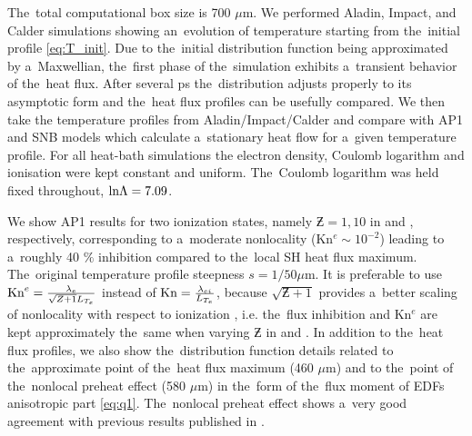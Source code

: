 The~total computational box size is 700 $\mu$m.
We performed Aladin, Impact, and Calder simulations showing an~evolution of
temperature starting from the~initial profile \eqref{eq:T_init}. 
Due to the~initial distribution function being approximated by a~Maxwellian,
the~first phase of the~simulation exhibits a~transient behavior of the~heat
flux. After several ps the~distribution adjusts properly to its asymptotic form
and the~heat flux profiles can be usefully compared. 
We then take the temperature profiles from Aladin/Impact/Calder and compare 
with AP1 and SNB models which calculate a~stationary heat flow
for a~given temperature profile. 
For all heat-bath simulations the electron density, Coulomb logarithm and 
ionisation were kept constant and uniform.
The~Coulomb logarithm was held fixed throughout, $\text{ln}\Lambda = 7.09$.

We show AP1 results for two ionization states, namely $\Zbar= 1, 10$ 
in  and , 
respectively, corresponding to a~moderate nonlocality 
(Kn$^e \sim 10^{-2}$) leading to a~roughly 40 $\%$ inhibition compared 
to the~local SH heat flux maximum. The~original temperature profile steepness
$s = 1/50 \mu$m.
It is preferable to use 
$\text{Kn}^e = \frac{\lambda_e}{\sqrt{Z + 1}L_{T_e}}$ instead of
 $\text{Kn} = \frac{\lambda_{ei}}{L_{T_e}}$, because $\sqrt{\Zbar + 1}$ provides 
a~better scaling of nonlocality with respect
to ionization \cite{LMV_1983_7}, i.e. the~flux inhibition and Kn$^e$ are
kept approximately the~same when varying $\Zbar$ in 
 and .
In addition to the~heat flux profiles, we also show the~distribution function 
details related to the~approximate point of the~heat flux maximum (460 $\mu$m) 
and to the~point of the~nonlocal preheat effect (580 $\mu$m) in the~form of
the~flux moment of EDFs anisotropic part \eqref{eq:q1}.
The~nonlocal preheat effect shows a~very good agreement with 
previous results published in \cite{Sherlock_PoP2017}.

